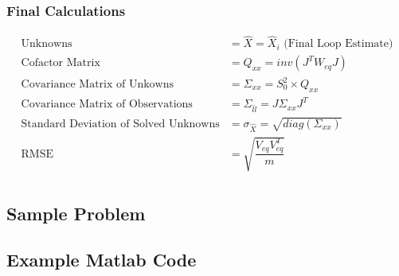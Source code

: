 \subsubsection{Final Calculations}
\begin{align*}
	\text{Unknowns} &= \hat{X} = \hat{X}_i \text{   (Final Loop Estimate)}\\
	\text{Cofactor Matrix} &= Q_{xx} = inv(J^TW_{eq}J) \\
	\text{Covariance Matrix of Unkowns} &= \Sigma_{xx} = S_0^2 \times Q_{xx} \\
	\text{Covariance Matrix of Observations} &= \Sigma_{\hat{l}\hat{l}} = J \Sigma_{xx} J^T \\
	\text{Standard Deviation of Solved Unknowns} &= \sigma_{\hat{X}} = \sqrt{diag(\Sigma_{xx})} \\
	\text{RMSE } &= \sqrt{\dfrac{V_{eq}V_{eq}^T}{m}} \\
\end{align*}
\clearpage
\subsection{Sample Problem}
\subsection{Example Matlab Code}
